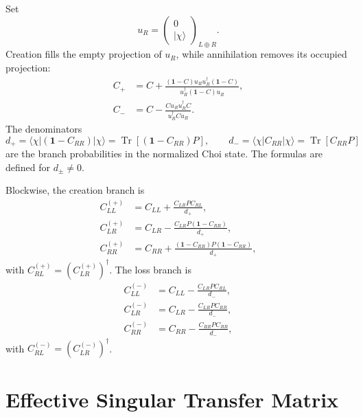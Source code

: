 \documentclass[aps,prb,onecolumn,nofootinbib,superscriptaddress]{revtex4-2}
\newcommand{\I}{\mathbf{1}}
\newcommand{\Tr}{\operatorname{Tr}}
\newcommand{\ket}[1]{\lvert #1\rangle}
\newcommand{\bra}[1]{\langle #1\rvert}
\theoremstyle{plain}
\theoremstyle{definition}
\begin{document}
Set
\begin{equation}
  u_R=
  \begin{pmatrix}
    0\\
    \ket{\chi}
  \end{pmatrix}_{L\oplus R}.
  \label{eq:uR}
\end{equation}
Creation fills the empty projection of \(u_R\), while annihilation removes its
occupied projection:
\begin{align}
  C_+
  &=
  C+
  \frac{(\I-C)u_Ru_R^\dagger(\I-C)}
       {u_R^\dagger(\I-C)u_R},
  \label{eq:C-plus-update}\\
  C_-
  &=
  C-
  \frac{Cu_Ru_R^\dagger C}
       {u_R^\dagger C u_R}.
  \label{eq:C-minus-update}
\end{align}
The denominators
\begin{equation}
  d_+
  =
  \bra{\chi}(\I-C_{RR})\ket{\chi}
  =
  \Tr[(\I-C_{RR})P],
  \qquad
  d_-
  =
  \bra{\chi}C_{RR}\ket{\chi}
  =
  \Tr[C_{RR}P]
  \label{eq:d-plus-minus}
\end{equation}
are the branch probabilities in the normalized Choi state.  The formulas are
defined for \(d_\pm\neq0\).

Blockwise, the creation branch is
\begin{align}
  C_{LL}^{(+)}
  &=
  C_{LL}
  +
  \frac{C_{LR}PC_{RL}}{d_+},
  \label{eq:C-plus-LL}\\
  C_{LR}^{(+)}
  &=
  C_{LR}
  -
  \frac{C_{LR}P(\I-C_{RR})}{d_+},
  \label{eq:C-plus-LR}\\
  C_{RR}^{(+)}
  &=
  C_{RR}
  +
  \frac{(\I-C_{RR})P(\I-C_{RR})}{d_+},
  \label{eq:C-plus-RR}
\end{align}
with \(C_{RL}^{(+)}=(C_{LR}^{(+)})^\dagger\).  The loss branch is
\begin{align}
  C_{LL}^{(-)}
  &=
  C_{LL}
  -
  \frac{C_{LR}PC_{RL}}{d_-},
  \label{eq:C-minus-LL}\\
  C_{LR}^{(-)}
  &=
  C_{LR}
  -
  \frac{C_{LR}PC_{RR}}{d_-},
  \label{eq:C-minus-LR}\\
  C_{RR}^{(-)}
  &=
  C_{RR}
  -
  \frac{C_{RR}PC_{RR}}{d_-},
  \label{eq:C-minus-RR}
\end{align}
with \(C_{RL}^{(-)}=(C_{LR}^{(-)})^\dagger\).

\section{Effective Singular Transfer Matrix}
\end{document}
